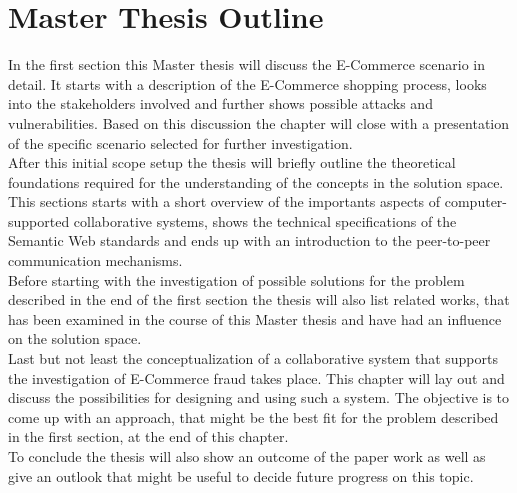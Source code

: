 
\section{Master Thesis Outline}
\label{sec:thesis_outline}

In the first section this Master thesis will discuss the E-Commerce scenario in detail. It starts with a description of the E-Commerce shopping process, looks into the stakeholders involved and further shows possible attacks and vulnerabilities. Based on this discussion the chapter will close with a presentation of the specific scenario selected for further investigation. \\

After this initial scope setup the thesis will briefly outline the theoretical foundations required for the understanding of the concepts in the solution space. This sections starts with a short overview of the importants aspects of computer-supported collaborative systems, shows the technical specifications of the Semantic Web standards and ends up with an introduction to the peer-to-peer communication mechanisms. \\

Before starting with the investigation of possible solutions for the problem described in the end of the first section the thesis will also list related works, that has been examined in the course of this Master thesis and have had an influence on the solution space. \\

Last but not least the conceptualization of a collaborative system that supports the investigation of E-Commerce fraud takes place. This chapter will lay out and discuss the possibilities for designing and using such a system. The objective is to come up with an approach, that might be the best fit for the problem described in the first section, at the end of this chapter. \\

To conclude the thesis will also show an outcome of the paper work as well as give an outlook that might be useful to decide future progress on this topic. 

